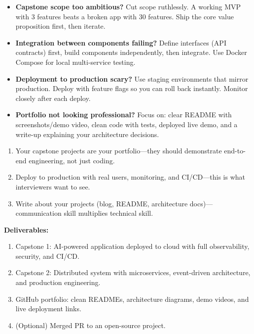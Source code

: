 \documentclass[11pt, a4paper, oneside]{report}
\begin{document}
\begin{stuckbox}
\begin{itemize}[leftmargin=*]
\item \textbf{Capstone scope too ambitious?} Cut scope ruthlessly. A working MVP with 3 features beats a broken app with 30 features. Ship the core value proposition first, then iterate.
\item \textbf{Integration between components failing?} Define interfaces (API contracts) first, build components independently, then integrate. Use Docker Compose for local multi-service testing.
\item \textbf{Deployment to production scary?} Use staging environments that mirror production. Deploy with feature flags so you can roll back instantly. Monitor closely after each deploy.
\item \textbf{Portfolio not looking professional?} Focus on: clear README with screenshots/demo video, clean code with tests, deployed live demo, and a write-up explaining your architecture decisions.
\end{itemize}
\end{stuckbox}


\begin{takeawaybox}
\begin{enumerate}[leftmargin=*]
\item Your capstone projects are your portfolio---they should demonstrate end-to-end engineering, not just coding.
\item Deploy to production with real users, monitoring, and CI/CD---this is what interviewers want to see.
\item Write about your projects (blog, README, architecture docs)---communication skill multiplies technical skill.
\end{enumerate}
\end{takeawaybox}

\begin{milestonebox}
\textbf{Deliverables:}
\begin{enumerate}[leftmargin=*]
\item Capstone 1: AI-powered application deployed to cloud with full observability, security, and CI/CD.
\item Capstone 2: Distributed system with microservices, event-driven architecture, and production engineering.
\item GitHub portfolio: clean READMEs, architecture diagrams, demo videos, and live deployment links.
\item (Optional) Merged PR to an open-source project.
\end{enumerate}
\end{milestonebox}
\end{document}
